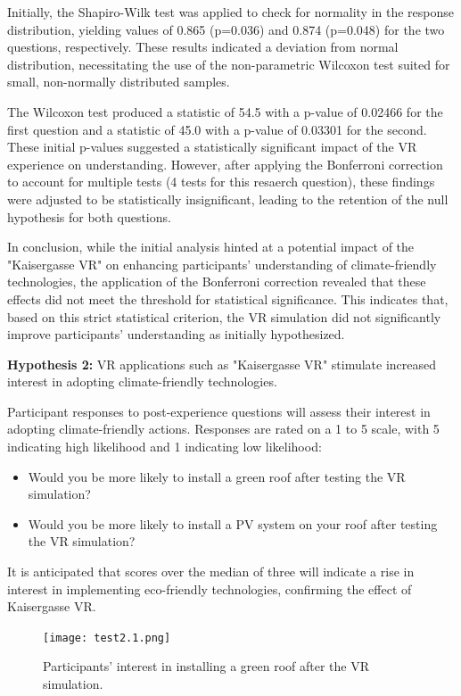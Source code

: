 \documentclass[draft, final]{vutinfth} %
\begin{document}
Initially, the Shapiro-Wilk test was applied to check for normality in the response distribution, yielding values of 0.865 (p=0.036) and 0.874 (p=0.048) for the two questions, respectively. These results indicated a deviation from normal distribution, necessitating the use of the non-parametric Wilcoxon test suited for small, non-normally distributed samples.

The Wilcoxon test produced a statistic of 54.5 with a p-value of 0.02466 for the first question and a statistic of 45.0 with a p-value of 0.03301 for the second. These initial p-values suggested a statistically significant impact of the VR experience on understanding. However, after applying the Bonferroni correction to account for multiple tests (4 tests for this resaerch question), these findings were adjusted to be statistically insignificant, leading to the retention of the null hypothesis for both questions.

In conclusion, while the initial analysis hinted at a potential impact of the "Kaisergasse VR" on enhancing participants' understanding of climate-friendly technologies, the application of the Bonferroni correction revealed that these effects did not meet the threshold for statistical significance. This indicates that, based on this strict statistical criterion, the VR simulation did not significantly improve participants' understanding as initially hypothesized.

\textbf{Hypothesis 2:} VR applications such as "Kaisergasse VR" stimulate increased interest in adopting climate-friendly technologies.

Participant responses to post-experience questions will assess their interest in adopting climate-friendly actions. Responses are rated on a 1 to 5 scale, with 5 indicating high likelihood and 1 indicating low likelihood:
\begin{itemize}
\item Would you be more likely to install a green roof after testing the VR simulation?
\item Would you be more likely to install a PV system on your roof after testing the VR simulation?
\end{itemize}
It is anticipated that scores over the median of three will indicate a rise in interest in implementing eco-friendly technologies, confirming the effect of Kaisergasse VR.

\begin{figure}[h]
\centering
\texttt{[image: test2.1.png]}
\caption[Interest in green roof installation post-VR]{Participants' interest in installing a green roof after the VR simulation.}
\label{fig:interest-green-roof}
\end{figure}
\end{document}
